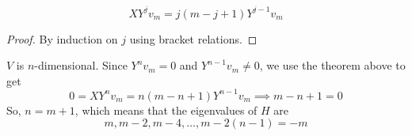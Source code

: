   \begin{theorem}
    \label{thm:action-of-the-raising-and-lowering-operators}
    \begin{equation}
      X Y^j v_m = j(m-j+1) Y^{j-1} v_m
    \end{equation}
  \end{theorem}
  \begin{proof}
    By induction on $j$ using bracket relations.
  \end{proof}

  $V$ is $n$-dimensional. Since $Y^n v_m = 0$ and $Y^{n-1} v_m \neq 0$, we use the theorem above to get
  \begin{equation}
    0 = X Y^n v_m = n (m-n+1) Y^{n-1} v_m \implies m-n+1=0
  \end{equation}
  So, $n = m+1$, which means that the eigenvalues of $H$ are
  \begin{equation}
    m, m-2, m-4, \ldots, m - 2(n-1) = -m
  \end{equation}

